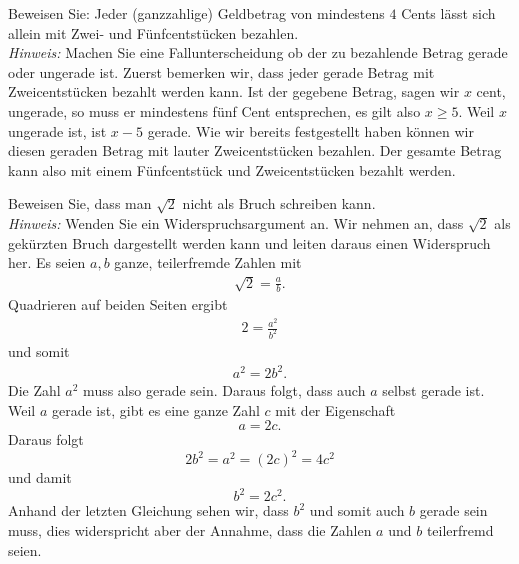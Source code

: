 \begin{example}
Beweisen Sie: Jeder (ganzzahlige) Geldbetrag von mindestens $4$ Cents lässt sich allein mit Zwei- und Fünfcentstücken bezahlen.\\
\textit{Hinweis:} Machen Sie eine Fallunterscheidung ob der zu bezahlende Betrag gerade oder ungerade ist.
\tcblower
Zuerst bemerken wir, dass jeder gerade Betrag mit Zweicentstücken bezahlt werden kann. Ist der gegebene Betrag, sagen wir $x$ cent, ungerade, so muss er mindestens fünf Cent entsprechen, es gilt also $x\geq 5$. Weil $x$ ungerade ist, ist $x-5$ gerade. Wie wir bereits festgestellt haben können wir diesen geraden Betrag mit lauter Zweicentstücken bezahlen. Der gesamte Betrag kann also mit einem Fünfcentstück und Zweicentstücken bezahlt werden.
\end{example}

\begin{example}
Beweisen Sie, dass man $\sqrt{2}$ nicht als Bruch schreiben kann.\\
\textit{Hinweis:} Wenden Sie ein Widerspruchsargument an.
\tcblower
Wir nehmen an, dass $\sqrt{2}$ als gekürzten Bruch dargestellt werden kann und leiten daraus einen Widerspruch her. Es seien $a,b$ ganze, teilerfremde Zahlen mit
\begin{align*}
\sqrt{2}=\frac{a}{b}.
\end{align*}
Quadrieren auf beiden Seiten ergibt
\begin{align*}
  2=\frac{a^2}{b^2}
\end{align*}
und somit
\begin{align*}
  a^2=2b^2.
\end{align*}
Die Zahl $a^2$ muss also gerade sein. Daraus folgt, dass auch $a$ selbst gerade ist. Weil $a$ gerade ist, gibt es eine ganze Zahl $c$ mit der Eigenschaft
\[
a=2c.
\]
Daraus folgt
\[
2b^2=a^2=(2c)^2=4c^2
\]
und damit
\[
b^2=2c^2.
\]
Anhand der letzten Gleichung sehen wir, dass $b^2$ und somit auch $b$ gerade sein muss, dies widerspricht aber der Annahme, dass die Zahlen $a$ und $b$ teilerfremd seien.
\end{example}